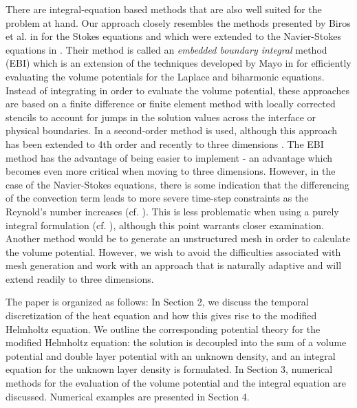 \documentclass[preprint,12pt]{elsarticle}
\begin{document}
There are integral-equation based methods that are also well suited for the problem at hand. Our approach closely resembles the methods presented by Biros et al. in \cite{BIROS} for the Stokes equations and which were extended to the Navier-Stokes equations in \cite{GB_LY_DZ}. 
Their method is called an {\it embedded boundary integral} method (EBI) which is an extension of the techniques developed by Mayo in \cite{mayo} for efficiently evaluating the volume potentials for the Laplace and biharmonic equations. 
Instead of integrating in order to evaluate the volume potential, these approaches are based on a finite difference or finite element method with locally corrected stencils to account for jumps in the solution values across the interface or physical boundaries. 
In \cite{GB_LY_DZ,BIROS,mayo} a second-order method is used, although this approach has been extended to 4th order and recently to three dimensions \cite{MAYO_2,mayo_greenbaum}.
The EBI method has the advantage of being easier to implement - an advantage which becomes even more critical when moving to three dimensions. However, in the case of the Navier-Stokes equations, there is some indication that the differencing of the convection term leads to more severe time-step constraints as the Reynold's number increases (cf.  \cite{GB_LY_DZ}). This is less problematic when using a purely integral formulation (cf. \cite{int:equation:nse}), although this point warrants closer examination.
Another method would be to generate an unstructured mesh in order to calculate the volume potential.  However, we wish to avoid the difficulties associated with mesh generation and work with an approach that is naturally adaptive and will extend readily to three dimensions.  

The paper is organized as follows: In Section 2, we discuss the temporal discretization of the heat equation and how this gives rise to the modified Helmholtz equation. 
We outline the corresponding potential theory for the modified Helmholtz equation: the solution is decoupled into the sum of a volume potential and double layer potential with an unknown density, and an integral equation for the unknown layer density is formulated. In Section 3,
numerical methods for the evaluation of the volume potential and the integral equation are 
discussed. 
Numerical examples are presented in Section 4.
\end{document}

